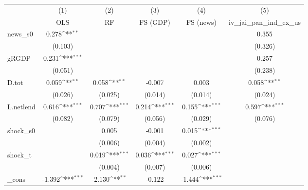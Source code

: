 {
\def\sym#1{\ifmmode^{#1}\else\(^{#1}\)\fi}
\begin{tabular}{l*{5}{c}}
\toprule
            &\multicolumn{1}{c}{(1)}&\multicolumn{1}{c}{(2)}&\multicolumn{1}{c}{(3)}&\multicolumn{1}{c}{(4)}&\multicolumn{1}{c}{(5)}\\
            &\multicolumn{1}{c}{OLS}&\multicolumn{1}{c}{RF}&\multicolumn{1}{c}{FS (GDP)}&\multicolumn{1}{c}{FS (news)}&\multicolumn{1}{c}{iv\_jai\_pan\_ind\_ex\_us}\\
\midrule
news\_s0     &       0.278\sym{**} &                     &                     &                     &       0.355         \\
            &     (0.103)         &                     &                     &                     &     (0.326)         \\
\addlinespace
gRGDP       &       0.231\sym{***}&                     &                     &                     &       0.257         \\
            &     (0.051)         &                     &                     &                     &     (0.238)         \\
\addlinespace
D.tot       &       0.059\sym{**} &       0.058\sym{**} &      -0.007         &       0.003         &       0.058\sym{**} \\
            &     (0.026)         &     (0.025)         &     (0.014)         &     (0.014)         &     (0.024)         \\
\addlinespace
L.netlend   &       0.616\sym{***}&       0.707\sym{***}&       0.214\sym{***}&       0.155\sym{***}&       0.597\sym{***}\\
            &     (0.082)         &     (0.079)         &     (0.056)         &     (0.029)         &     (0.076)         \\
\addlinespace
shock\_s0    &                     &       0.005         &      -0.001         &       0.015\sym{***}&                     \\
            &                     &     (0.006)         &     (0.004)         &     (0.002)         &                     \\
\addlinespace
shock\_t     &                     &       0.019\sym{***}&       0.036\sym{***}&       0.027\sym{***}&                     \\
            &                     &     (0.004)         &     (0.007)         &     (0.006)         &                     \\
\addlinespace
\_cons      &      -1.392\sym{***}&      -2.130\sym{**} &      -0.122         &      -1.444\sym{***}&                     \\

\end{tabular}}
